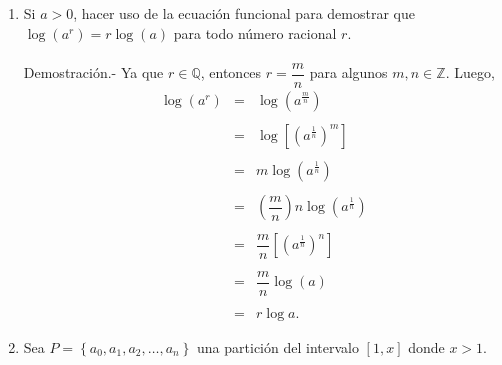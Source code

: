 \begin{enumerate}[\bfseries 1.]
\begin{enumerate}[a)]
	\end{enumerate}

    \item Si $a>0$, hacer uso de la ecuación funcional para demostrar que $\log\left(a^r \right)=r\log(a)$ para todo número racional $r$.\\\\
	Demostración.-\; Ya que $r\in \mathbb{Q}$, entonces $r=\dfrac{m}{n}$ para algunos $m,n\in \mathbb{Z}$. Luego, 
	$$
	\begin{array}{rcl}
	    \log\left(a^r\right) &=& \log\left(a^{\frac{m}{n}}\right)\\\\
				 &=& \log\left[\left(a^{\frac{1}{n}}\right)^m\right]\\\\
				 &=& m\log\left(a^{\frac{1}{n}}\right)\\\\
				 &=& \left(\dfrac{m}{n}\right)n \log\left(a^{\frac{1}{n}}\right)\\\\
				 &=& \dfrac{m}{n}\left[\left(a^{\frac{1}{n}}\right)^n\right]\\\\
				 &=& \dfrac{m}{n}\log(a)\\\\
				 &=& r\log a.
	\end{array}
	$$
	\vspace{.5cm}

    \item Sea $P=\left\{a_0,a_1,a_2,\ldots,a_n\right\}$ una partición del intervalo $[1,x]$ donde $x>1.$

	\begin{enumerate}[a)]


\end{enumerate}
\end{enumerate}
